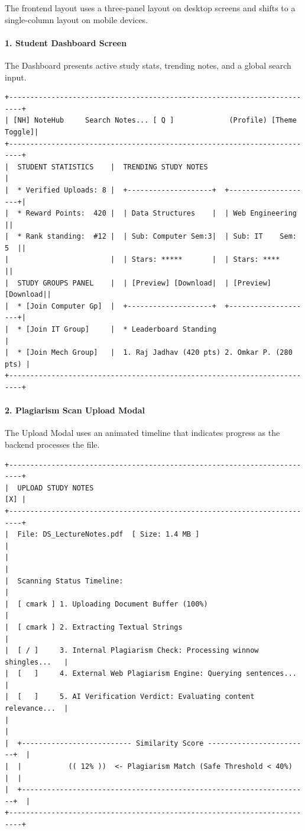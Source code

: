 \documentclass[12,Times new Roman,a4paper]{report}
\begin{document}
The frontend layout uses a three-panel layout on desktop screens and shifts to a single-column layout on mobile devices.

\paragraph{1. Student Dashboard Screen}
The Dashboard presents active study stats, trending notes, and a global search input.
\begin{verbatim}
+-------------------------------------------------------------------------+
| [NH] NoteHub     Search Notes... [ Q ]             (Profile) [Theme Toggle]|
+-------------------------------------------------------------------------+
|  STUDENT STATISTICS    |  TRENDING STUDY NOTES                          |
|  * Verified Uploads: 8 |  +--------------------+  +--------------------+|
|  * Reward Points:  420 |  | Data Structures    |  | Web Engineering    ||
|  * Rank standing:  #12 |  | Sub: Computer Sem:3|  | Sub: IT    Sem: 5  ||
|                        |  | Stars: *****       |  | Stars: ****        ||
|  STUDY GROUPS PANEL    |  | [Preview] [Download|  | [Preview] [Download||
|  * [Join Computer Gp]  |  +--------------------+  +--------------------+|
|  * [Join IT Group]     |  * Leaderboard Standing                        |
|  * [Join Mech Group]   |  1. Raj Jadhav (420 pts) 2. Omkar P. (280 pts) |
+-------------------------------------------------------------------------+
\end{verbatim}

\paragraph{2. Plagiarism Scan Upload Modal}
The Upload Modal uses an animated timeline that indicates progress as the backend processes the file.
\begin{verbatim}
+-------------------------------------------------------------------------+
|  UPLOAD STUDY NOTES                                                 [X] |
+-------------------------------------------------------------------------+
|  File: DS_LectureNotes.pdf  [ Size: 1.4 MB ]                            |
|                                                                         |
|  Scanning Status Timeline:                                              |
|  [ cmark ] 1. Uploading Document Buffer (100%)                          |
|  [ cmark ] 2. Extracting Textual Strings                                |
|  [ / ]     3. Internal Plagiarism Check: Processing winnow shingles...   |
|  [   ]     4. External Web Plagiarism Engine: Querying sentences...     |
|  [   ]     5. AI Verification Verdict: Evaluating content relevance...  |
|                                                                         |
|  +-------------------------- Similarity Score ------------------------+  |
|  |           (( 12% ))  <- Plagiarism Match (Safe Threshold < 40%)    |  |
|  +--------------------------------------------------------------------+  |
+-------------------------------------------------------------------------+
\end{verbatim}
\end{document}
